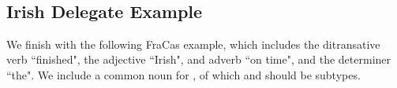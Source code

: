 \begin{code}
\<%
\\
%
\\[\AgdaEmptyExtraSkip]%
%
\>[2]\AgdaSpace{}%
\AgdaSymbol{:}\AgdaSpace{}%
\AgdaSpace{}%
\<%
\\
%
\>[2]\AgdaSpace{}%
\AgdaSymbol{=}\AgdaSpace{}%
\AgdaSpace{}%
\AgdaSymbol{\{}\AgdaSpace{}%
\AgdaSpace{}%
\AgdaSymbol{=}\AgdaSpace{}%
\AgdaSpace{}%
\AgdaSpace{}%
\AgdaSpace{}%
\AgdaSpace{}%
\AgdaSpace{}%
\AgdaOperator{\AgdaFunction{\$}}\AgdaSpace{}%
\AgdaSymbol{\}}\<%
\\
%
\\[\AgdaEmptyExtraSkip]%
%
\>[2]\AgdaSpace{}%
\AgdaSymbol{:}\AgdaSpace{}%
\AgdaSpace{}%
\<%
\\
%
\>[2]\AgdaSpace{}%
\AgdaSymbol{=}\AgdaSpace{}%
\AgdaSpace{}%
\AgdaSymbol{\{}\AgdaSpace{}%
\AgdaSpace{}%
\AgdaSymbol{=}\AgdaSpace{}%
\AgdaSpace{}%
\AgdaSpace{}%
\AgdaSpace{}%
\AgdaSpace{}%
\AgdaSpace{}%
\AgdaOperator{\AgdaFunction{\$}}\AgdaSpace{}%
\AgdaSymbol{\}}\<%
\\
%
\\[\AgdaEmptyExtraSkip]%
\>[0]\AgdaSpace{}%
\AgdaSymbol{:}\AgdaSpace{}%
\AgdaSpace{}%
\AgdaSpace{}%
%
\>[24]\AgdaSpace{}%
\AgdaSpace{}%
\AgdaSpace{}%
\<%
\\
\>[0]\AgdaSpace{}%
\AgdaSymbol{(}\AgdaSpace{}%
\AgdaOperator{\AgdaInductiveConstructor{,}}\AgdaSpace{}%
\AgdaSymbol{)}\AgdaSpace{}%
\AgdaSymbol{=}\AgdaSpace{}%
\AgdaSpace{}%
\AgdaSpace{}%
\AgdaOperator{\AgdaInductiveConstructor{,}}\AgdaSpace{}%
\<%
\end{code}

\subsection{Irish Delegate Example}

We finish with the following FraCas example, which includes the ditransative
verb ``finished", the adjective ``Irish", and adverb ``on time", and the
determiner ``the". We include a common noun for , of which
 and  should be subtypes.

